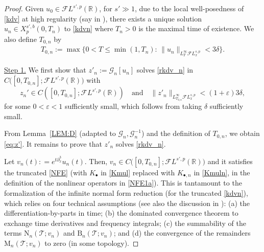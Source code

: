 \documentclass[a4paper,
11pt,  reqno]{amsart}
\newcommand{\5}{\textup{V}}
\newcommand{\noi}{\noindent}
\newcommand{\FL}{\mathcal{F} L}
\newcommand{\dl}{\delta}
\newcommand{\eps}{\varepsilon}
\newcommand{\dx}{\partial_x}
\theoremstyle{remark}
\newcommand{\R}{\mathbb{R}}
\newcommand{\bul}{\bullet}
\newcommand{\TT}{\mathcal{T}}
\newcommand{\Gc}{\mathcal{G}}
\numberwithin{equation}{section}
\numberwithin{theorem}{section}
\newcommand{\MM}{\mathrm{M}}
\newcommand{\NN}{\mathrm{N}}
\newcommand{\BB}{\mathrm{B}}
\begin{document}
\begin{proof}

Given $u_0 \in \FL^{s',p}(\R)$, for $s'\gg1$, due to the local well-posedness of \eqref{kdv} at high regularity (say in \cite{Grunrock_ldv_hier}), there exists a unique solution $u_n \in X^{s',b}_p(0,T_n)$ to \eqref{kdvn} where $T_n>0$ is the maximal time of existence. We also define $T_{0,n}$ by
\begin{align}
T_{0,n} :=
\max \big\{
0 < T \le \min(1, T_n) : \, \| u_n\|_{L^\infty_T \FL^{s,p}_x} < 3 \dl
\big\}.
\end{align}


\noi
\underline{Step 1.} We first show that $z'_n := \Gc_n[u_n]$ solves \eqref{rkdv_n} in $C\big([0,T_{0,n}] ; \FL^{s',p}(\R)\big)$ with
\begin{equation}
	z_n'\in C([0,T_{0,n}];\FL^{s',p}(\R))
\quad
\text{and}
\quad
\|z'_n\|_{L^\infty_{T_{0,n}} \FL^{s,p}_x} < (1+\eps) 3 \delta,
\label{eq:z'}
\end{equation}
for some $0<\eps<1$ sufficiently small, which follows from taking $\dl$ sufficiently small.

From Lemma~\ref{LEM:D} (adapted to $\Gc_n, \Gc_n^{-1}$) and the definition of $T_{0,n}$, we obtain \eqref{eq:z'}.
It remains to prove that $z'_n$ solves \eqref{rkdv_n}.

Let $v_n(t) : = e^{t\dx^3} u_n(t)$.
Then, $v_n \in C \big( [0,T_{0,n}] ; \FL^{s',p}(\R) \big)$ and it satisfies the truncated \eqref{NFE} (with $K_\bul$ in \eqref{Kmul} replaced with $K_{\bul, n}$ in \eqref{Kmuln}, in the definition of the nonlinear operators in \eqref{NFE1a}).
This is tantamount to the formalization of the infinite normal form reduction (for the truncated \eqref{kdvn}), which relies on four technical assumptions (see also the discussion in \cite[Section 4]{KOY20}): (a) the differentiation-by-parts in time; (b) the dominated convergence theorem to exchange time derivatives and frequency integrals; (c) the summability of the terms $\NN_n(\TT;v_n)$ and $\BB_n(\TT;v_n)$; and (d) the convergence of the remainders $\MM_n(\TT;v_n)$ to zero (in some topology).


\end{proof}
\end{document}
